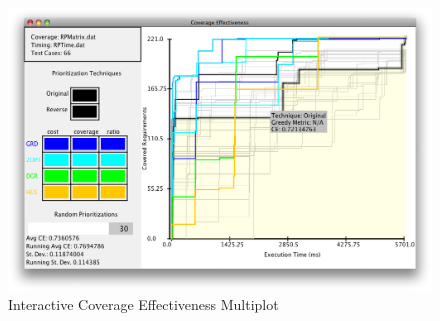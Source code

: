\documentclass{vgtc}                          %
\begin{document}
\begin{figure}
\includegraphics[scale=.25]{screenshot.png}
\vspace{-.3in}
\caption{Interactive Coverage Effectiveness Multiplot}
\vspace{-.2in}
\label{fig:screenshot}
\end{figure}




\end{document}
